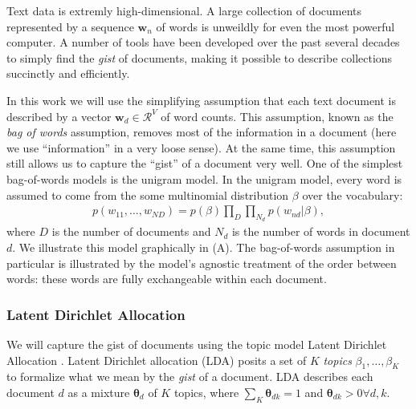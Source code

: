   
  Text data is extremly high-dimensional.  A large collection of
  documents represented by a sequence $\bm w_n$ of words is unweildly
  for even the most powerful computer.  A number of tools have been
  developed over the past several decades to simply find the
  \emph{gist} of documents, making it possible to describe collections
  succinctly and efficiently.

  In this work we will use the simplifying assumption that each text
  document is described by a vector $\bm w_d \in \mathcal{R}^V$ of
  word counts.  This assumption, known as the \emph{bag of words}
  assumption, removes most of the information in a document (here we
  use ``information'' in a very loose sense).  At the same time, this
  assumption still allows us to capture the ``gist'' of a document
  very well. One of the simplest bag-of-words models is the unigram
  model. In the unigram model, every word is assumed to come from the
  some multinomial distribution $\beta$ over the vocabulary:
  \begin{align*}
    p(w_{11}, \ldots, w_{ND}) = p(\beta) \prod_D \prod_{N_d} p(w_{nd} |
  \beta),
\end{align*}
  where $D$ is the number of documents and $N_d$ is the number of
  words in document $d$.
  We illustrate this model graphically in
   (A).  The bag-of-words assumption in
  particular is illustrated by the model's agnostic treatment of the
  order between words: these words are fully exchangeable within each
  document.

\subsubsection{Latent Dirichlet Allocation}
We will capture the gist of documents using the topic model Latent
Dirichlet Allocation \citep{blei:2003}.  Latent Dirichlet allocation
(LDA) posits a set of $K$ \emph{topics} $\beta_1, \ldots, \beta_K$ to
formalize what we mean by the \emph{gist} of a document.  LDA
describes each document $d$ as a mixture $\bm \theta_d$ of $K$ topics,
where $\sum_K \bm \theta_{dk} = 1$ and $\bm \theta_{dk} > 0
\forall d,k$.

